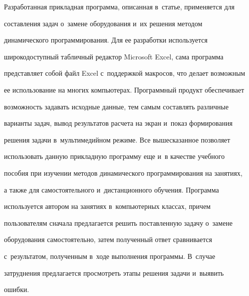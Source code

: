   Разработанная прикладная программа, описанная в~статье, применяется для 


составления задач о~замене оборудования и~их решения методом 


динамического программирования. Для ее разработки используется 


широкодоступный табличный редактор Microsoft Excel, сама программа 


представляет собой файл Excel с~под\-держ\-кой макросов, что делает возможным 


ее использование на многих компью\-те\-рах. Программный продукт обеспечивает 


возможность задавать исходные данные, тем самым составлять различные 


варианты задач, вывод результатов расчета на экран и~показ формирования 


решения задачи в~мультимедийном режиме. Все вышесказанное позволяет 


использовать данную прикладную программу еще и~в качестве учебного 


пособия при изучении методов динамического программирования на занятиях, 


а также для самостоятельного и~дистанционного обучения. Программа 


используется автором на занятиях в~компьютерных классах, причем 


пользователям сначала предлагается решить по\-став\-лен\-ную задачу о~замене 


обору\-до\-ва\-ния самостоятельно, затем полученный ответ сравнивается 


с~результатом, полученным в~ходе выполнения про\-грам\-мы. В~случае 


затруднения предлагается просмотреть этапы решения задачи и~вы\-явить 


ошибки. 


  


